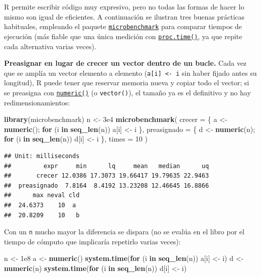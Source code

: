 \documentclass[
]{book}
\newenvironment{Shaded}{\begin{snugshade}}{\end{snugshade}}
\newcommand{\AttributeTok}[1]{\textcolor[rgb]{0.13,0.29,0.53}{#1}}
\newcommand{\ControlFlowTok}[1]{\textcolor[rgb]{0.13,0.29,0.53}{\textbf{#1}}}
\newcommand{\DecValTok}[1]{\textcolor[rgb]{0.00,0.00,0.81}{#1}}
\newcommand{\FloatTok}[1]{\textcolor[rgb]{0.00,0.00,0.81}{#1}}
\newcommand{\FunctionTok}[1]{\textcolor[rgb]{0.13,0.29,0.53}{\textbf{#1}}}
\newcommand{\NormalTok}[1]{#1}
\newcommand{\OtherTok}[1]{\textcolor[rgb]{0.56,0.35,0.01}{#1}}
\theoremstyle{break}
\theoremstyle{nonumberplain}
\begin{document}
R permite escribir código muy expresivo, pero no todas las formas de hacer lo mismo son igual de eficientes. A continuación se ilustran tres buenas prácticas habituales, empleando el paquete \href{https://github.com/joshuaulrich/microbenchmark/}{\texttt{microbenchmark}} para comparar tiempos de ejecución (más fiable que una única medición con \href{https://rdrr.io/r/base/proc.time.html}{\texttt{proc.time()}}, ya que repite cada alternativa varias veces).

\textbf{Preasignar en lugar de crecer un vector dentro de un bucle.} Cada vez que se amplía un vector elemento a elemento (\texttt{a{[}i{]}\ \textless{}-\ i} sin haber fijado antes su longitud), R puede tener que reservar memoria nueva y copiar todo el vector; si se preasigna con \href{https://rdrr.io/r/base/numeric.html}{\texttt{numeric()}} (o \texttt{vector()}), el tamaño ya es el definitivo y no hay redimensionamientos:

\begin{Shaded}
\begin{Highlighting}[]
\FunctionTok{library}\NormalTok{(microbenchmark)}
\NormalTok{n }\OtherTok{\textless{}{-}} \FloatTok{3e4}
\FunctionTok{microbenchmark}\NormalTok{(}
  \AttributeTok{crecer      =}\NormalTok{ \{ a }\OtherTok{\textless{}{-}} \FunctionTok{numeric}\NormalTok{(); }\ControlFlowTok{for}\NormalTok{ (i }\ControlFlowTok{in} \FunctionTok{seq\_len}\NormalTok{(n)) a[i] }\OtherTok{\textless{}{-}}\NormalTok{ i \},}
  \AttributeTok{preasignado =}\NormalTok{ \{ d }\OtherTok{\textless{}{-}} \FunctionTok{numeric}\NormalTok{(n); }\ControlFlowTok{for}\NormalTok{ (i }\ControlFlowTok{in} \FunctionTok{seq\_len}\NormalTok{(n)) d[i] }\OtherTok{\textless{}{-}}\NormalTok{ i \},}
  \AttributeTok{times =} \DecValTok{10}
\NormalTok{)}
\end{Highlighting}
\end{Shaded}

\begin{verbatim}
## Unit: milliseconds
##         expr     min      lq     mean   median      uq
##       crecer 12.0386 17.3073 19.66417 19.79635 22.9463
##  preasignado  7.8164  8.4192 13.23208 12.46645 16.8866
##      max neval cld
##  24.6373    10  a 
##  20.8209    10   b
\end{verbatim}

Con un \texttt{n} mucho mayor la diferencia se dispara (no se evalúa en el libro por el tiempo de cómputo que implicaría repetirlo varias veces):

\begin{Shaded}
\begin{Highlighting}[]
\NormalTok{n }\OtherTok{\textless{}{-}} \FloatTok{1e8}
\NormalTok{a }\OtherTok{\textless{}{-}} \FunctionTok{numeric}\NormalTok{()}
\FunctionTok{system.time}\NormalTok{(}\ControlFlowTok{for}\NormalTok{ (i }\ControlFlowTok{in} \FunctionTok{seq\_len}\NormalTok{(n)) a[i] }\OtherTok{\textless{}{-}}\NormalTok{ i)}
\NormalTok{d }\OtherTok{\textless{}{-}} \FunctionTok{numeric}\NormalTok{(n)}
\FunctionTok{system.time}\NormalTok{(}\ControlFlowTok{for}\NormalTok{ (i }\ControlFlowTok{in} \FunctionTok{seq\_len}\NormalTok{(n)) d[i] }\OtherTok{\textless{}{-}}\NormalTok{ i)}
\end{Highlighting}
\end{Shaded}
\end{document}
